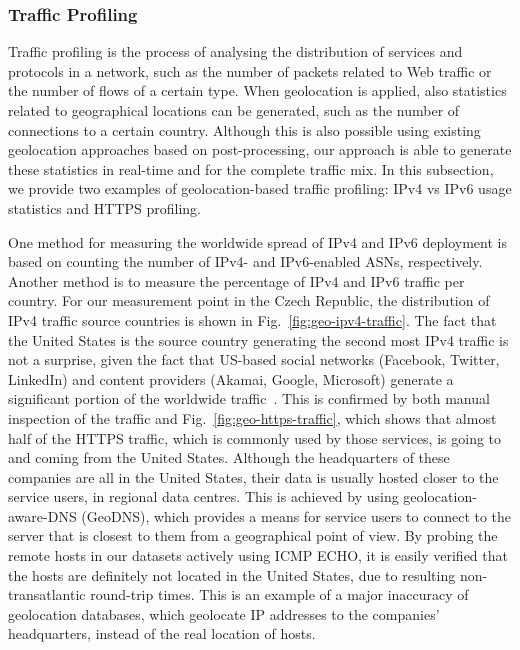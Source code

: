 \subsubsection{Traffic Profiling}

Traffic profiling is the process of analysing the distribution of services and protocols in a network, such as the number of packets related to Web traffic or the number of flows of a certain type. When geolocation is applied, also statistics related to geographical locations can be generated, such as the number of connections to a certain country. Although this is also possible using existing geolocation approaches based on post-processing, our approach is able to generate these statistics in real-time and for the complete traffic mix. In this subsection, we provide two examples of geolocation-based traffic profiling: IPv4 vs IPv6 usage statistics and HTTPS profiling.

One method for measuring the worldwide spread of IPv4 and IPv6 deployment is based on counting the number of IPv4- and IPv6-enabled ASNs, respectively. Another method is to measure the percentage of IPv4 and IPv6 traffic per country. For our measurement point in the Czech Republic, the distribution of IPv4 traffic source countries is shown in Fig.~\ref{fig:geo-ipv4-traffic}. The fact that the United States is the source country generating the second most IPv4 traffic is not a surprise, given the fact that US-based social networks (Facebook, Twitter, LinkedIn) and content providers (Akamai, Google, Microsoft) generate a significant portion of the worldwide traffic~\cite{Gehlen-2012-Uncovering}. This is confirmed by both manual inspection of the traffic and Fig.~\ref{fig:geo-https-traffic}, which shows that almost half of the HTTPS traffic, which is commonly used by those services, is going to and coming from the United States. Although the headquarters of these companies are all in the United States, their data is usually hosted closer to the service users, in regional data centres. This is achieved by using geolocation-aware-DNS (GeoDNS), which provides a means for service users to connect to the server that is closest to them from a geographical point of view. By probing the remote hosts in our datasets actively using ICMP ECHO, it is easily verified that the hosts are definitely not located in the United States, due to resulting non-transatlantic round-trip times. This is an example of a major inaccuracy of geolocation databases, which geolocate IP addresses to the companies' headquarters, instead of the real location of hosts.

